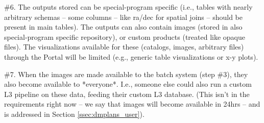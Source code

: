 \#6. The outputs stored can be special-program specific (i.e., tables with nearly arbitrary schemas -- some columns -- like ra/dec for spatial joins -- should be present in main tables). The outputs can also contain images (stored in also special-program specific repository), or custom products (treated like opaque files). The visualizations available for these (catalogs, images, arbitrary files) through the Portal will be limited (e.g., generic table visualizations or x-y plots).

\#7. When the images are made available to the batch system (step \#3), they also become available to *everyone*. I.e., someone else could also run a custom L3 pipeline on these data, feeding their custom L3 database. (This isn't in the requirements right now -- we say that images will become available in 24hrs -- and is addressed in Section \ref{ssec:dmplans_user}).